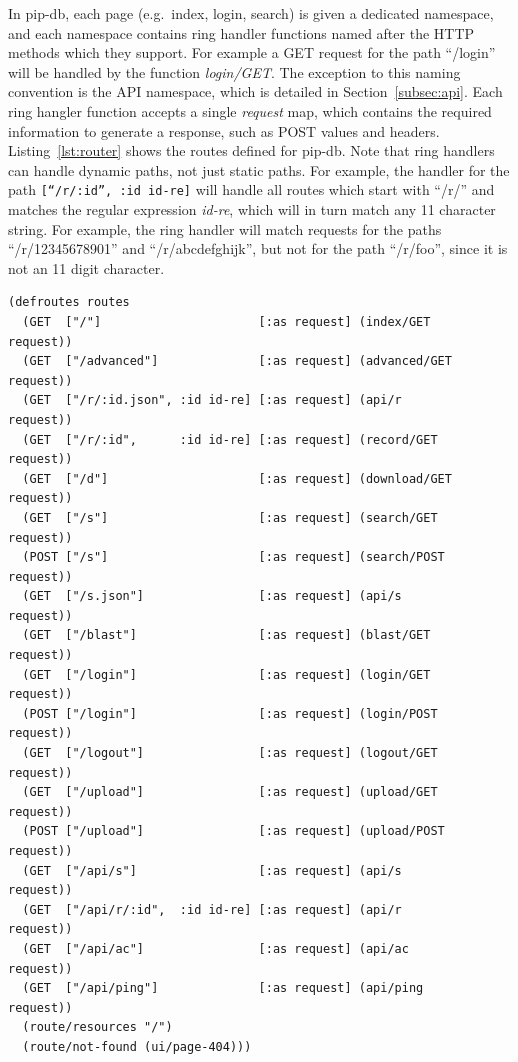 In pip-db, each page (e.g.\ index, login, search) is given a dedicated
namespace, and each namespace contains ring handler functions named
after the HTTP methods which they support. For example a GET request
for the path ``/login'' will be handled by the function
\textit{login/GET}. The exception to this naming convention is the API
namespace, which is detailed in Section~\ref{subsec:api}. Each
ring hangler function accepts a single \textit{request} map, which
contains the required information to generate a response, such as POST
values and headers. Listing~\ref{lst:router} shows the routes defined
for pip-db. Note that ring handlers can handle dynamic paths, not just
static paths. For example, the handler for the path
\texttt{[``/r/:id'', :id id-re]} will handle all routes which start
with ``/r/'' and matches the regular expression \textit{id-re}, which
will in turn match any 11 character string. For example, the ring
handler will match requests for the paths ``/r/12345678901'' and
``/r/abcdefghijk'', but not for the path ``/r/foo'', since it is not
an 11 digit character.

\br{}


\lstset{language=clojure}
\begin{lstlisting}[label=lst:router,caption={%
      [Application ring handler routes]
      Application ring handler routes, taken from \texttt{middleware.clj}.}]
(defroutes routes
  (GET  ["/"]                      [:as request] (index/GET       request))
  (GET  ["/advanced"]              [:as request] (advanced/GET    request))
  (GET  ["/r/:id.json", :id id-re] [:as request] (api/r           request))
  (GET  ["/r/:id",      :id id-re] [:as request] (record/GET      request))
  (GET  ["/d"]                     [:as request] (download/GET    request))
  (GET  ["/s"]                     [:as request] (search/GET      request))
  (POST ["/s"]                     [:as request] (search/POST     request))
  (GET  ["/s.json"]                [:as request] (api/s           request))
  (GET  ["/blast"]                 [:as request] (blast/GET       request))
  (GET  ["/login"]                 [:as request] (login/GET       request))
  (POST ["/login"]                 [:as request] (login/POST      request))
  (GET  ["/logout"]                [:as request] (logout/GET      request))
  (GET  ["/upload"]                [:as request] (upload/GET      request))
  (POST ["/upload"]                [:as request] (upload/POST     request))
  (GET  ["/api/s"]                 [:as request] (api/s           request))
  (GET  ["/api/r/:id",  :id id-re] [:as request] (api/r           request))
  (GET  ["/api/ac"]                [:as request] (api/ac          request))
  (GET  ["/api/ping"]              [:as request] (api/ping        request))
  (route/resources "/")
  (route/not-found (ui/page-404)))
\end{lstlisting}

